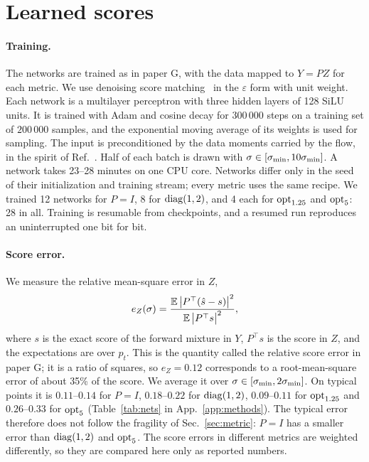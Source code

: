 \section{Learned scores}
\label{sec:learning}

\paragraph*{Training.}
The networks are trained as in paper G, with the data mapped to $Y=PZ$ for each metric.
We use denoising score matching~\cite{vincent2011dsm,hyvarinen2005score} in the $\varepsilon$ form with unit weight.
Each network is a multilayer perceptron with three hidden layers of 128 SiLU units.
It is trained with Adam and cosine decay for 300\,000 steps on a training set of $200\,000$ samples, and the exponential moving average of its weights is used for sampling.
The input is preconditioned by the data moments carried by the flow, in the spirit of Ref.~\cite{karras2022edm}.
Half of each batch is drawn with $\sigma\in[\sigma_{\min},10\sigma_{\min}]$.
A network takes 23--28 minutes on one CPU core.
Networks differ only in the seed of their initialization and training stream; every metric uses the same recipe.
We trained 12 networks for $P=I$, 8 for $\mathrm{diag}(1,2)$, and 4 each for $\mathrm{opt}_{1.25}$ and $\mathrm{opt}_{5}$: 28 in all.
Training is resumable from checkpoints, and a resumed run reproduces an uninterrupted one bit for bit.

\paragraph*{Score error.}
We measure the relative mean-square error in $Z$,
\begin{equation}
e_Z(\sigma)=\frac{\mathbb E\,\bigl|P^{\top}(\hat s-s)\bigr|^2}{\mathbb E\,\bigl|P^{\top}s\bigr|^2},
\end{equation}
where $s$ is the exact score of the forward mixture in $Y$, $P^{\top}s$ is the score in $Z$, and the expectations are over $p_t$.
This is the quantity called the relative score error in paper G; it is a ratio of squares, so $e_Z=0.12$ corresponds to a root-mean-square error of about 35\% of the score.
We average it over $\sigma\in[\sigma_{\min},2\sigma_{\min}]$.
On typical points it is $0.11$--$0.14$ for $P=I$, $0.18$--$0.22$ for $\mathrm{diag}(1,2)$, $0.09$--$0.11$ for $\mathrm{opt}_{1.25}$ and $0.26$--$0.33$ for $\mathrm{opt}_{5}$ (Table~\ref{tab:nets} in App.~\ref{app:methods}).
The typical error therefore does not follow the fragility of Sec.~\ref{sec:metric}: $P=I$ has a smaller error than $\mathrm{diag}(1,2)$ and $\mathrm{opt}_{5}$.
The score errors in different metrics are weighted differently, so they are compared here only as reported numbers.
